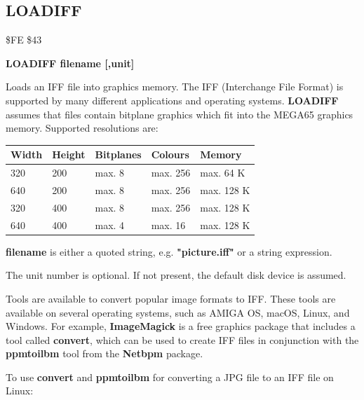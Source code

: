 \subsection{LOADIFF}
\begin{description}[leftmargin=2cm,style=nextline]
\item [Token:] \$FE \$43
\item [Format:] {\bf LOADIFF filename [,unit]}
\item [Usage:]

   Loads an IFF file into graphics memory.
   The IFF (Interchange File Format) is supported by many different applications
   and operating systems. {\bf LOADIFF} assumes that files
   contain bitplane graphics which fit into the MEGA65 graphics memory.
   Supported resolutions are:
\begin{center}
{\ttfamily
\setlength{\tabcolsep}{1mm}
\begin{tabular}{|l|l|l|l|l|}
\hline
 Width             & Height & Bitplanes & Colours & Memory \\
\hline
320                     &  200    & max. 8     & max. 256 & max. 64 K \\
640                     &  200    & max. 8     & max. 256 & max. 128 K \\
320                     &  400    & max. 8     & max. 256 & max. 128 K \\
640                     &  400    & max. 4     & max.  16 & max. 128 K \\
\hline
\end{tabular}
}
\end{center}

   {\bf filename} is either a quoted string, e.g. {\bf "picture.iff"} or
   a string expression.

   The unit number is optional.
   If not present, the default disk device is assumed.

\item [Remarks:]
   Tools are available to convert popular image formats to IFF. These tools
   are available on several operating systems, such as AMIGA OS, macOS, Linux, and Windows.
   For example, {\bf ImageMagick} is a free graphics package that includes a tool
   called {\bf convert}, which can be used to create IFF files in conjunction
   with the {\bf ppmtoilbm} tool from the {\bf Netbpm} package.

To use {\bf convert} and {\bf ppmtoilbm} for converting a JPG file to an IFF file on Linux:


\end{description}
